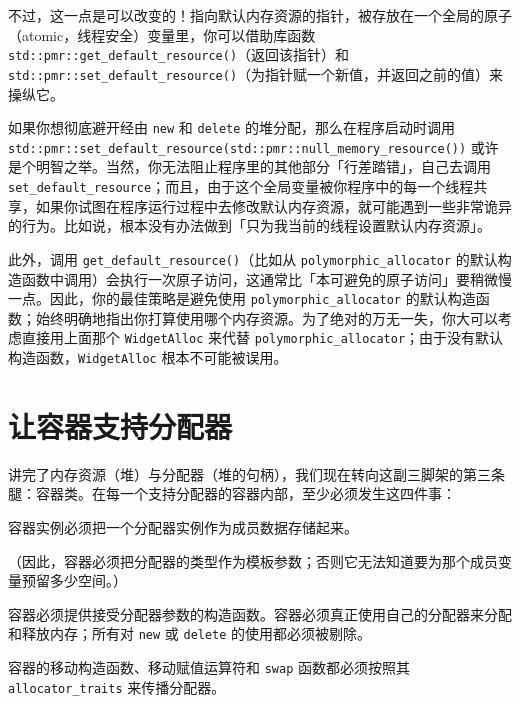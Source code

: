 不过，这一点是可以改变的！指向默认内存资源的指针，被存放在一个全局的原子（atomic，线程安全）变量里，你可以借助库函数 \texttt{std::\allowbreak{}pmr::\allowbreak{}get\_\allowbreak{}default\_\allowbreak{}resource(\allowbreak{})\allowbreak{}}（返回该指针）和 \texttt{std::\allowbreak{}pmr::\allowbreak{}set\_\allowbreak{}default\_\allowbreak{}resource(\allowbreak{})\allowbreak{}}（为指针赋一个新值，并返回之前的值）来操纵它。

如果你想彻底避开经由 \texttt{new} 和 \texttt{delete} 的堆分配，那么在程序启动时调用 \texttt{std::\allowbreak{}pmr::\allowbreak{}set\_\allowbreak{}default\_\allowbreak{}resource(\allowbreak{}std::\allowbreak{}pmr::\allowbreak{}null\_\allowbreak{}memory\_\allowbreak{}resource(\allowbreak{})\allowbreak{})\allowbreak{}} 或许是个明智之举。当然，你无法阻止程序里的其他部分「行差踏错」，自己去调用 \texttt{set\_\allowbreak{}default\_\allowbreak{}resource}；而且，由于这个全局变量被你程序中的每一个线程共享，如果你试图在程序运行过程中去修改默认内存资源，就可能遇到一些非常诡异的行为。比如说，根本没有办法做到「只为我当前的线程设置默认内存资源」。

此外，调用 \texttt{get\_\allowbreak{}default\_\allowbreak{}resource(\allowbreak{})\allowbreak{}}（比如从 \texttt{polymorphic\_\allowbreak{}allocator} 的默认构造函数中调用）会执行一次原子访问，这通常比「本可避免的原子访问」要稍微慢一点。因此，你的最佳策略是避免使用 \texttt{polymorphic\_\allowbreak{}allocator} 的默认构造函数；始终明确地指出你打算使用哪个内存资源。为了绝对的万无一失，你大可以考虑直接用上面那个 \texttt{Widget\allowbreak{}Alloc} 来代替 \texttt{polymorphic\_\allowbreak{}allocator}；由于没有默认构造函数，\texttt{Widget\allowbreak{}Alloc} 根本不可能被误用。

\section{让容器支持分配器}

讲完了内存资源（堆）与分配器（堆的句柄），我们现在转向这副三脚架的第三条腿：容器类。在每一个支持分配器的容器内部，至少必须发生这四件事：

容器实例必须把一个分配器实例作为成员数据存储起来。

（因此，容器必须把分配器的类型作为模板参数；否则它无法知道要为那个成员变量预留多少空间。）

容器必须提供接受分配器参数的构造函数。容器必须真正使用自己的分配器来分配和释放内存；所有对 \texttt{new} 或 \texttt{delete} 的使用都必须被剔除。

容器的移动构造函数、移动赋值运算符和 \texttt{swap} 函数都必须按照其 \texttt{allocator\_\allowbreak{}traits} 来传播分配器。

